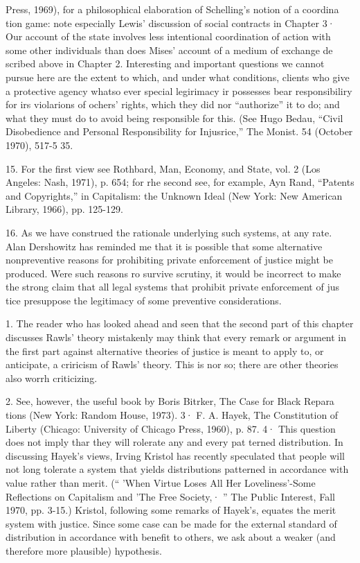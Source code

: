 \documentclass[11pt,openany]{book}
\begin{document}
{Press, 1969), for a philosophical elaboration of Schelling's notion of a coordina tion game: note especially Lewis' discussion of social contracts in Chapter 3· Our account of the state involves less intentional coordination of action with some other individuals than does Mises' account of a medium of exchange de scribed above in Chapter 2. Interesting and important questions we cannot pursue here are the extent to which, and under what conditions, clients who give a protective agency whatso ever special legirimacy ir possesses bear responsibiliry for irs violarions of ochers' rights, which they did nor ``authorize'' it to do; and what they must do to avoid being responsible for this. (See Hugo Bedau, ``Civil Disobedience and Personal Responsibility for Injusrice,'' The Monist. 54 (October 1970), 517-5 35.\par

15. For the first view see Rothbard, Man, Economy, and State, vol. 2 (Los Angeles: Nash, 1971), p. 654; for rhe second see, for example, Ayn Rand, ``Patents and Copyrights,'' in Capitalism: the Unknown Ideal (New York: New American Library, 1966), pp. 125-129.\par

16. As we have construed the rationale underlying such systems, at any rate. Alan Dershowitz has reminded me that it is possible that some alternative nonpreventive reasons for prohibiting private enforcement of justice might be produced. Were such reasons ro survive scrutiny, it would be incorrect to make the strong claim that all legal systems that prohibit private enforcement of jus tice presuppose the legitimacy of some preventive considerations.\par

1. The reader who has looked ahead and seen that the second part of this chapter discusses Rawls' theory mistakenly may think that every remark or argument in the first part against alternative theories of justice is meant to apply to, or anticipate, a criricism of Rawls' theory. This is nor so; there are other theories also worrh criticizing.\par

2. See, however, the useful book by Boris Bitrker, The Case for Black Repara tions (New York: Random House, 1973). 3· F. A. Hayek, The Constitution of Liberty (Chicago: University of Chicago Press, 1960), p. 87. 4· This question does not imply thar they will rolerate any and every pat terned distribution. In discussing Hayek's views, Irving Kristol has recently speculated that people will not long tolerate a system that yields distributions patterned in accordance with value rather than merit. (`` 'When Virtue Loses All Her Loveliness'-Some Reflections on Capitalism and 'The Free Society,· '' The Public Interest, Fall 1970, pp. 3-15.) Kristol, following some remarks of Hayek's, equates the merit system with justice. Since some case can be made for the external standard of distribution in accordance with benefit to others, we ask about a weaker (and therefore more plausible) hypothesis.\par

}
\end{document}
